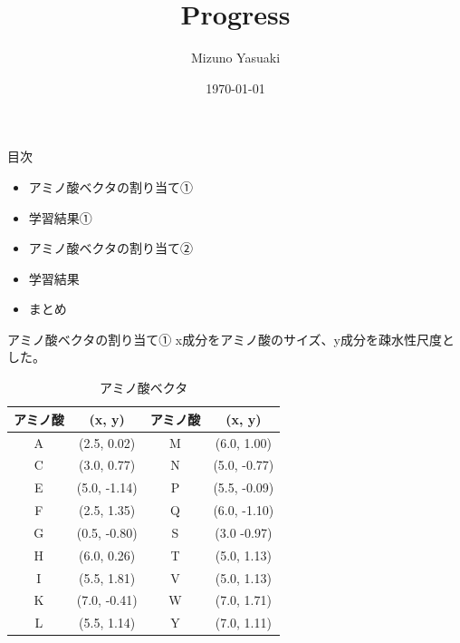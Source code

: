 \documentclass[dvipdfmx]{beamer}
\title{Progress}
\date{\today}
\author{Mizuno Yasuaki}
\begin{document}
  \maketitle
  
  \begin{frame}{目次}
    \begin{itemize}
      \item アミノ酸ベクタの割り当て①
      \item 学習結果①
      \item アミノ酸ベクタの割り当て②
      \item 学習結果
      \item まとめ
    \end{itemize}
  \end{frame}

  \begin{frame}{アミノ酸ベクタの割り当て①}
    x成分をアミノ酸のサイズ、y成分を疎水性尺度とした。
    \begin{table}[H]
      \centering
      \caption{アミノ酸ベクタ}
      \label{tab:amino_vector_1}
      \begin{tabular}{cccc}
        \hline
        アミノ酸 & (x, y) & アミノ酸 & (x, y) \\
        \hline \hline
        A & (2.5, 0.02) & M & (6.0, 1.00) \\
        C & (3.0, 0.77) & N & (5.0, -0.77) \\
        E & (5.0, -1.14) & P & (5.5, -0.09) \\
        F & (2.5, 1.35) & Q & (6.0, -1.10) \\
        G & (0.5, -0.80) & S & (3.0 -0.97) \\
        H & (6.0, 0.26) & T & (5.0, 1.13) \\
        I & (5.5, 1.81) & V & (5.0, 1.13) \\
        K & (7.0, -0.41) & W & (7.0, 1.71) \\
        L & (5.5, 1.14) & Y & (7.0, 1.11) \\
        \hline
      \end{tabular}
    \end{table}
  \end{frame}
\end{document}
